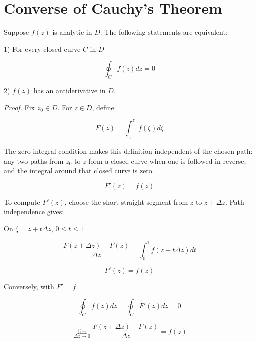 \documentclass[11pt,a4paper]{article}
\theoremstyle{definition}
\theoremstyle{plain}
\begin{document}
\section{Converse of Cauchy's Theorem}

Suppose $f(z)$ is analytic in $D$. The following statements are equivalent:

1) For every closed curve $C$ in $D$

\begin{equation}
\oint_{C}f(z)dz = 0
\end{equation}

2) $f(z)$ has an antiderivative in $D$.

\textit{Proof.} Fix $z_{0} \in D$. For $z \in D$, define

\begin{equation}
F(z) = \int_{z_{0}}^{z}f(\zeta)d\zeta
\end{equation}

The zero-integral condition makes this definition independent of the chosen path: any two paths from $z_{0}$ to $z$ form a closed curve when one is followed in reverse, and the integral around that closed curve is zero.

\begin{equation}
F'(z) = f(z)
\end{equation}

To compute $F'(z)$, choose the short straight segment from $z$ to $z + \Delta z$. Path independence gives:

On $\zeta = z + t\Delta z$, $0 \le t \le 1$

\begin{equation}
\frac{F(z + \Delta z) - F(z)}{\Delta z} = \int_{0}^{1}f(z + t\Delta z)dt
\end{equation}

\[
F'(z) = f(z)
\]

Conversely, with $F'= f$

\begin{equation}
\oint_{C}f(z)dz = \oint_{C}F'(z)dz = 0
\end{equation}

\[
\lim_{\Delta z \to 0}\frac{F(z + \Delta z) - F(z)}{\Delta z} = f(z)
\]
\end{document}

